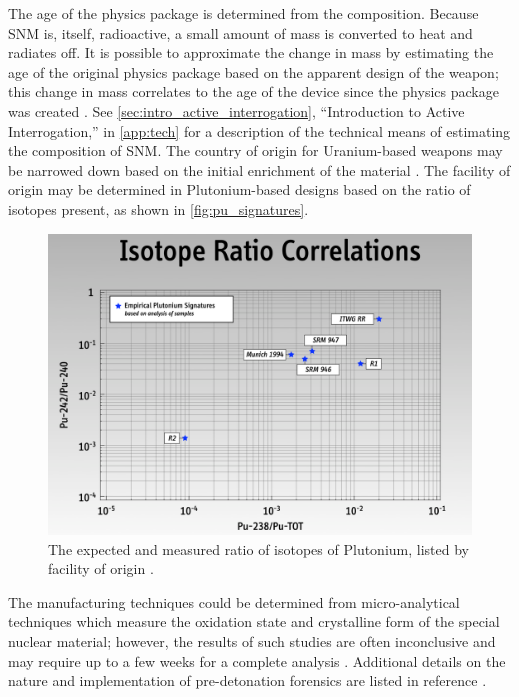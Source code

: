 \documentclass{report}
\begin{document}
The age of the physics package is determined from the composition. Because SNM is, itself, radioactive, a small amount of mass is converted to heat and radiates off. It is possible to approximate the change in mass by estimating the age of the original physics package based on the apparent design of the weapon; this change in mass correlates to the age of the device since the physics package was created \cite{Inn2013}. See \autoref{sec:intro_active_interrogation}, \enquote{Introduction to Active Interrogation,} in \autoref{app:tech} for a description of the technical means of estimating the composition of SNM. The country of origin for Uranium-based weapons may be narrowed down based on the initial enrichment of the material \cite{Defense1998}. The facility of origin may be determined in Plutonium-based designs based on the ratio of isotopes present, as shown in \autoref{fig:pu_signatures}.

\begin{figure}[h]
 \centering
 \includegraphics[trim = 0cm 0cm 0cm 0cm, clip,scale=0.3]{./figures/pu_signatures.png}
   \caption{The expected and measured ratio of isotopes of Plutonium, listed by facility of origin \cite{B412922A}.}
     \label{fig:pu_signatures}
\end{figure}


The manufacturing techniques could be determined from micro-analytical techniques which measure the oxidation state and crystalline form of the special nuclear material; however, the results of such studies are often inconclusive and may require up to a few weeks for a complete analysis \cite{Drell1995}. Additional details on the nature and implementation of pre-detonation forensics are listed in reference \cite{Doyle2011}. 
\end{document}
